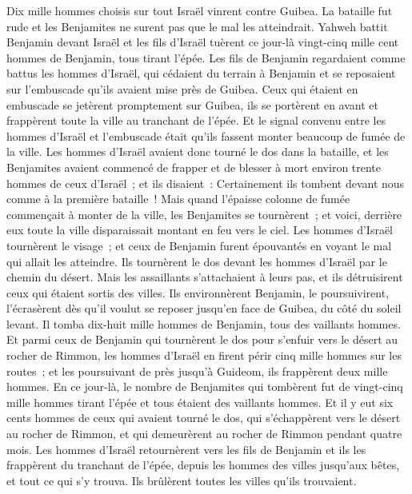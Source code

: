 \begin{multicols}{2}
Dix mille hommes choisis sur tout Israël vinrent contre Guibea. La bataille fut rude et les Benjamites ne surent pas que le mal les atteindrait.
Yahweh battit Benjamin devant Israël et les fils d'Israël tuèrent ce jour-là vingt-cinq mille cent hommes de Benjamin, tous tirant l'épée.
Les fils de Benjamin regardaient comme battus les hommes d'Israël, qui cédaient du terrain à Benjamin et se reposaient sur l'embuscade qu'ils avaient mise près de Guibea.
Ceux qui étaient en embuscade se jetèrent promptement sur Guibea, ils se portèrent en avant et frappèrent toute la ville au tranchant de l'épée.
Et le signal convenu entre les hommes d'Israël et l'embuscade était qu'ils fassent monter beaucoup de fumée de la ville.
Les hommes d'Israël avaient donc tourné le dos dans la bataille, et les Benjamites avaient commencé de frapper et de blesser à mort environ trente hommes de ceux d'Israël~; et ils disaient~: Certainement ils tombent devant nous comme à la première bataille~!
Mais quand l'épaisse colonne de fumée commençait à monter de la ville, les Benjamites se tournèrent~; et voici, derrière eux toute la ville disparaissait montant en feu vers le ciel.
Les hommes d'Israël tournèrent le visage~; et ceux de Benjamin furent épouvantés en voyant le mal qui allait les atteindre.
Ils tournèrent le dos devant les hommes d'Israël par le chemin du désert. Mais les assaillants s'attachaient à leurs pas, et ils détruisirent ceux qui étaient sortis des villes.
Ils environnèrent Benjamin, le poursuivirent, l'écrasèrent dès qu'il voulut se reposer jusqu'en face de Guibea, du côté du soleil levant.
Il tomba dix-huit mille hommes de Benjamin, tous des vaillants hommes.
Et parmi ceux de Benjamin qui tournèrent le dos pour s'enfuir vers le désert au rocher de Rimmon, les hommes d'Israël en firent périr cinq mille hommes sur les routes~; et les poursuivant de près jusqu'à Guideom, ils frappèrent deux mille hommes.
En ce jour-là, le nombre de Benjamites qui tombèrent fut de vingt-cinq mille hommes tirant l'épée et tous étaient des vaillants hommes.
Et il y eut six cents hommes de ceux qui avaient tourné le dos, qui s'échappèrent vers le désert au rocher de Rimmon, et qui demeurèrent au rocher de Rimmon pendant quatre mois.
Les hommes d'Israël retournèrent vers les fils de Benjamin et ils les frappèrent du tranchant de l'épée, depuis les hommes des villes jusqu'aux bêtes, et tout ce qui s'y trouva. Ils brûlèrent toutes les villes qu'ils trouvaient.

\end{multicols}
